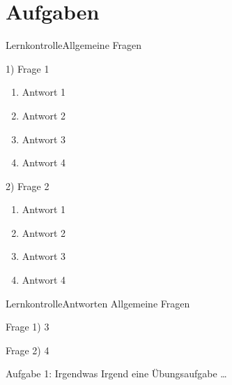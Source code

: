 \section{Aufgaben}
\begin{frame}{Lernkontrolle}{Allgemeine Fragen}
    \begin{footnotesize}
        1) Frage 1

        \begin{enumerate}
            \item Antwort 1
            \item Antwort 2
            \item Antwort 3
            \item Antwort 4
        \end{enumerate}

        2) Frage 2

        \begin{enumerate}
            \item Antwort 1
            \item Antwort 2
            \item Antwort 3
            \item Antwort 4
        \end{enumerate}
    \end{footnotesize}
\end{frame}

\begin{frame}{Lernkontrolle}{Antworten}
    Allgemeine Fragen
    \medskip

    \begin{footnotesize}
    Frage 1) 3
    \medskip

    Frage 2) 4
    \end{footnotesize}
\end{frame}

\begin{frame}{Aufgabe 1: Irgendwas}
    Irgend eine Übungsaufgabe …
\end{frame}
